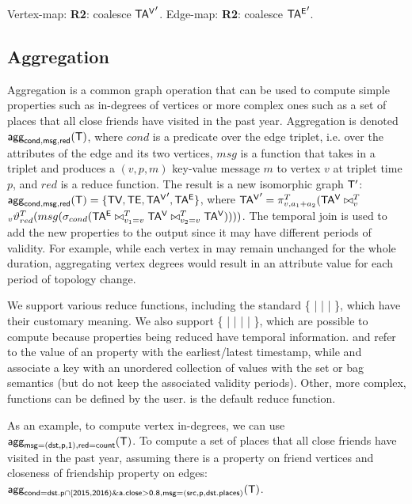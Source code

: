 Vertex-map: {\bf R2}: coalesce $\mathsf{TA^{V}}'$.  Edge-map: {\bf R2}: coalesce
$\mathsf{TA^{E}}'$.


\subsection{Aggregation}
\label{sec:algebra:agg}

Aggregation is a common graph operation that can be used to compute
simple properties such as in-degrees of vertices or more complex ones
such as a set of places that all close friends have visited in the
past year.  Aggregation is denoted $\textsf{agg}_{\mathsf{cond,msg,red}}(\mathsf{T})$, where
$cond$ is a predicate over the edge triplet, i.e. over the attributes
of the edge and its two vertices, $msg$ is a function that takes in a
triplet and produces a $(v,p,m)$ key-value message $m$ to vertex $v$
at triplet time $p$, and $red$ is a reduce function.  The result is a
new isomorphic graph $\mathsf{T}'$: $\textsf{agg}_{\mathsf{cond,msg,red}}(\mathsf{T}) = \{ \textsf{TV},
\textsf{TE}, \mathsf{TA^{V}}', \mathsf{TA^{E}} \}$, where $\mathsf{TA^{V}}' = \pi^T_{v,a_1+a_2}(\mathsf{TA^{V}}
\bowtie^T_v$ \\ $_v\vartheta^T_{red} (msg (\sigma_{cond} (\mathsf{TA^{E}}
\bowtie^T_{v_1=v} \mathsf{TA^{V}} \bowtie^T_{v_2=v} \mathsf{TA^{V}}))))$.  The temporal join
is used to add the new properties to the output since it may have
different periods of validity.  For example, while each vertex in \tg
may remain unchanged for the whole duration, aggregating vertex
degrees would result in an attribute value for each period of topology
change.

We support various reduce functions, including the standard \{
 |  |  |  \}, which have
their customary meaning.  We also support \{  |
 |  |  |  \}, which
are possible to compute because properties being reduced have temporal
information.   and  refer to the value of an
property with the earliest/latest timestamp, while  and
 associate a key with an unordered collection of values
with the set or bag semantics (but do not keep the associated validity
periods).  Other, more complex, functions can be defined by the user.
 is the default reduce function.

As an example, to compute vertex in-degrees, we can use
$\textsf{agg}_{\mathsf{msg=(dst,p,1),red=count}}(\mathsf{T})$.  To compute a set of places
that all close friends have visited in the past year, assuming there
is a property  on friend vertices and closeness of
friendship property on edges:\\ $\textsf{agg}_{\mathsf{cond=dst.p \cap [2015,2016) \&
    a.close > 0.8,msg=(src,p,dst.places)}}(\mathsf{T})$.

